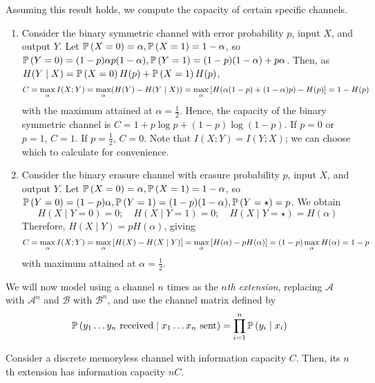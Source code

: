 \begin{example}
    Assuming this result holds, we compute the capacity of certain specific channels.
    \begin{enumerate}
        \item Consider the binary symmetric channel with error probability \( p \), input \( X \), and output \( Y \).
        Let \( \mathbb{P}\left({X = 0}\right) = \alpha, \mathbb{P}\left({X = 1}\right) = 1 - \alpha \), so \( \mathbb{P}\left({Y = 0}\right) = (1-p)\alpha p(1-\alpha), \mathbb{P}\left({Y = 1}\right) = (1-p)(1-\alpha) + p\alpha \).
        Then, as \( H(Y \mid X) = \mathbb{P}\left({X=0}\right) H(p) + \mathbb{P}\left({X = 1}\right) H(p) \),
        \[ C = \max_\alpha I(X;Y) = \max_\alpha (H(Y) - H(Y\mid X)) = \max_\alpha \qty[H(\alpha(1-p) + (1-\alpha)p) - H(p)] = 1 - H(p) \]
        with the maximum attained at \( \alpha = \frac{1}{2} \).
        Hence, the capacity of the binary symmetric channel is \( C = 1 + p \log p + (1-p) \log (1-p) \).
        If \( p = 0 \) or \( p = 1 \), \( C = 1 \).
        If \( p = \frac{1}{2} \), \( C = 0 \).
        Note that \( I(X;Y) = I(Y;X) \); we can choose which to calculate for convenience.
        \item Consider the binary erasure channel with erasure probability \( p \), input \( X \), and output \( Y \).
        Let \( \mathbb{P}\left({X = 0}\right) = \alpha, \mathbb{P}\left({X = 1}\right) = 1 - \alpha \), so \( \mathbb{P}\left({Y = 0}\right) = (1-p)\alpha, \mathbb{P}\left({Y = 1}\right) = (1-p)(1-\alpha), \mathbb{P}\left({Y = \star}\right) = p \).
        We obtain
        \[ H(X \mid Y = 0) = 0;\quad H(X \mid Y = 1) = 0;\quad H(X \mid Y = \star) = H(\alpha) \]
        Therefore, \( H(X \mid Y) = pH(\alpha) \), giving
        \[ C = \max_\alpha I(X;Y) = \max_\alpha \qty[H(X) - H(X \mid Y)] = \max_\alpha \qty[H(\alpha) - pH(\alpha)] = (1-p) \max_\alpha H(\alpha) = 1-p \]
        with maximum attained at \( \alpha = \frac{1}{2} \).
    \end{enumerate}
\end{example}
We will now model using a channel \( n \) times as the \emph{\( n \)th extension}, replacing \( \mathcal A \) with \( \mathcal A^n \) and \( \mathcal B \) with \( \mathcal B^n \), and use the channel matrix defined by
\[ \mathbb{P}\left({y_1 \dots y_n \text{ received} \mid x_1 \dots x_n \text{ sent}}\right) = \prod_{i=1}^n \mathbb{P}\left({y_i \mid x_i}\right) \]
\begin{lemma}
    Consider a discrete memoryless channel with information capacity \( C \).
    Then, its \( n \)th extension has information capacity \( nC \).
\end{lemma}
